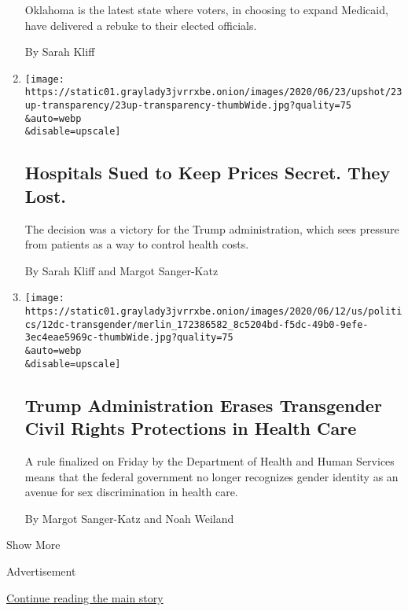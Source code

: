\begin{enumerate}
  Oklahoma is the latest state where voters, in choosing to expand
  Medicaid, have delivered a rebuke to their elected officials.

  By Sarah Kliff
\item
  \href{/2020/06/23/upshot/hospitals-lost-price-transparency-lawsuit.html}{}

  \texttt{[image: https://static01.graylady3jvrrxbe.onion/images/2020/06/23/upshot/23up-transparency/23up-transparency-thumbWide.jpg?quality=75\\\&auto=webp\\\&disable=upscale]}

  \hypertarget{hospitals-sued-to-keep-prices-secret-they-lost}{%
  \subsection{Hospitals Sued to Keep Prices Secret. They
  Lost.}\label{hospitals-sued-to-keep-prices-secret-they-lost}}

  The decision was a victory for the Trump administration, which sees
  pressure from patients as a way to control health costs.

  By Sarah Kliff and Margot Sanger-Katz
\item
  \href{/2020/06/12/us/politics/trump-transgender-rights.html}{}

  \texttt{[image: https://static01.graylady3jvrrxbe.onion/images/2020/06/12/us/politics/12dc-transgender/merlin\_172386582\_8c5204bd-f5dc-49b0-9efe-3ec4eae5969c-thumbWide.jpg?quality=75\\\&auto=webp\\\&disable=upscale]}

  \hypertarget{trump-administration-erases-transgender-civil-rights-protections-in-health-care}{%
  \subsection{Trump Administration Erases Transgender Civil Rights
  Protections in Health
  Care}\label{trump-administration-erases-transgender-civil-rights-protections-in-health-care}}

  A rule finalized on Friday by the Department of Health and Human
  Services means that the federal government no longer recognizes gender
  identity as an avenue for sex discrimination in health care.

  By Margot Sanger-Katz and Noah Weiland
\end{enumerate}

Show More

Advertisement

\protect\hyperlink{after-mid1}{Continue reading the main story}

